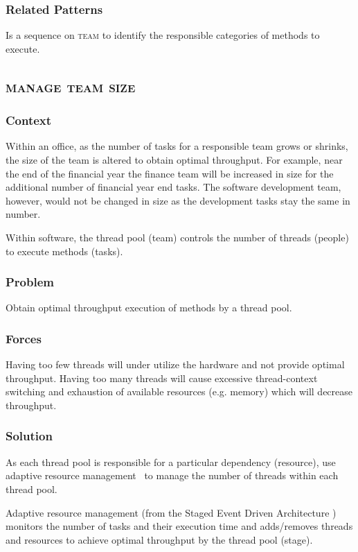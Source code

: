 \documentclass[prodmode]{style/acmlarge}
\begin{document}
\subsubsection*{Related Patterns} Is a sequence on \textsc{team} to identify
the responsible categories of methods to execute.



\subsection{\textsc{\textbf{manage team size}}}

\subsubsection*{Context} Within an office, as the number of tasks for a
responsible team grows or shrinks, the size of the team is altered to obtain
optimal throughput.  For example, near the end of the financial year the finance
team will be increased in size for the additional number of financial year end
tasks.  The software development team, however, would not be changed in size as
the development tasks stay the same in number.

Within software, the thread pool (team) controls the number of threads (people)
to execute methods (tasks).

\subsubsection*{Problem} Obtain optimal throughput execution of methods by a
thread pool.

\subsubsection*{Forces} Having too few threads will under utilize the hardware
and not provide optimal throughput.  Having too many threads will cause
excessive thread-context switching and exhaustion of available resources (e.g.
memory) which will decrease throughput.

\subsubsection*{Solution} As each thread pool is responsible for a particular
dependency (resource), use adaptive resource management~\cite{seda} to manage
the number of threads within each thread pool.

Adaptive resource management (from the Staged Event Driven Architecture
\cite{seda}) monitors the number of tasks and their execution time and
adds/removes threads and resources to achieve optimal throughput by the thread
pool (stage).
\end{document}
